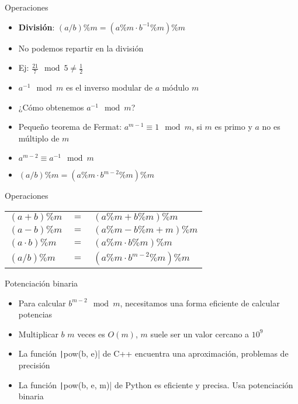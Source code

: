 \documentclass[10pt]{beamer}
\newcommand{\bi}{\begin{itemize}}
\newcommand{\ei}{\end{itemize}}
\begin{document}
\begin{frame}{Operaciones}
  \bi
    \item \textbf{División}: $(a / b) \% m = (a \% m \cdot b^{-1} \% m) \% m$
    \item No podemos repartir en la división
    \item Ej: $\frac{21}{7} \mod 5 \neq \frac{1}{2}$
    
    \vspace{20pt}

    \item<2-> $a^{-1} \mod m$ es el inverso modular de $a$ módulo $m$
    \item<2-> ¿Cómo obtenemos $a^{-1} \mod m$?
    \item<3-> Pequeño teorema de Fermat: $a^{m - 1} \equiv 1 \mod m$, si $m$ es primo y $a$ no es múltiplo de $m$
    \item<4-> $a^{m - 2} \equiv a^{-1} \mod m$
    \item<5-> $(a / b) \% m = (a \% m \cdot b^{m-2} \% m) \% m$
  \ei
\end{frame}

\begin{frame}{Operaciones}
  \begin{center}
    \begin{tabular}{lcl}
      $(a + b) \% m$     & $=$ & $(a \% m + b \% m) \% m$ \\[10pt]
      $(a - b) \% m$     & $=$ & $(a \% m - b \% m + m) \% m$ \\[10pt]
      $(a \cdot b) \% m$ & $=$ & $(a \% m \cdot b \% m) \% m$ \\[10pt]
      $(a / b) \% m$     & $=$ & $(a \% m \cdot b^{m-2} \% m) \% m$ \\
    \end{tabular}
  \end{center}
\end{frame}

\begin{frame}{Potenciación binaria}
  \bi
    \item Para calcular $b^{m-2} \mod m$, necesitamos una forma eficiente de calcular potencias
    \item Multiplicar $b$ $m$ veces es $O(m)$, $m$ suele ser un valor cercano a $10^9$
    \item<2-> La función \texttt|pow(b, e)| de C++ encuentra una aproximación, problemas de precisión
    \item<3-> La función \texttt|pow(b, e, m)| de Python es eficiente y precisa. Usa potenciación binaria
  \ei
\end{frame}
\end{document}

